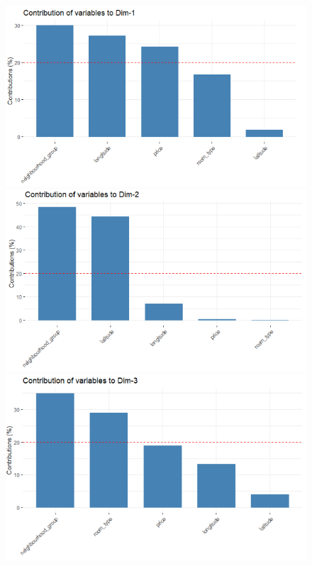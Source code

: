 \documentclass{FR16}
\begin{document}
\begin{figure}[!htb]
   \begin{minipage}{0.33\textwidth}
     \centering
     \includegraphics[width=1\linewidth]{figures/FAMD7.png} 
   \end{minipage}\hfill
   \begin{minipage}{0.33\textwidth}
     \centering
     \includegraphics[width=1\linewidth]{figures/FAMD8.png}
   \end{minipage}
   \begin{minipage}{0.33\textwidth}
     \centering
     \includegraphics[width=1\linewidth]{figures/FAMD9.png} 

\end{minipage}
\end{figure}
\end{document}
